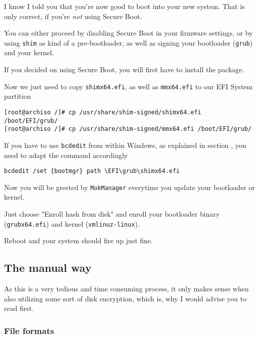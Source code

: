 \documentclass[10pt]{dustdoc}
\begin{document}
I know I told you that you’re now good to boot into your new system.
That is only correct, if you’re \emph{not} using Secure Boot.

You can either proceed by disabling Secure Boot in your firmware settings, or by using \texttt{shim} as kind of a pre-bootloader, as well as signing your bootloader (\texttt{grub}) and your kernel.

If you decided on using Secure Boot, you will first have to install the package.

Now we just need to copy \texttt{shimx64.efi}, as well as \texttt{mmx64.efi} to our EFI System partition

\begin{verbatim}
[root@archiso /]# cp /usr/share/shim-signed/shimx64.efi /boot/EFI/grub/
[root@archiso /]# cp /usr/share/shim-signed/mmx64.efi /boot/EFI/grub/
\end{verbatim}

\begin{NOTE}
    If you have to use \texttt{bcdedit} from within Windows, as explained in section , you need to adapt the command accordingly

    \begin{verbatim}
bcdedit /set {bootmgr} path \EFI\grub\shimx64.efi
    \end{verbatim}
\end{NOTE}

Now you will be greeted by \texttt{MokManager} everytime you update your bootloader or kernel.

Just choose "Enroll hash from disk" and enroll your bootloader binary (\texttt{grubx64.efi}) and kernel (\texttt{vmlinuz-linux}).

Reboot and your system should fire up just fine.

\subsection{The manual way}
\label{sec:the-manual-way}

\begin{WARNING}
    As this is a very tedious and time consuming process, it only makes sense when also utilizing some sort of disk encryption, which is, why I would advise you to read  first.
\end{WARNING}

\subsubsection{File formats}
\label{sec:file-formats}
\end{document}
